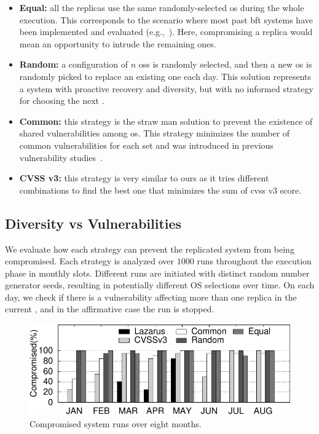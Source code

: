 \begin{itemize}

\item \textbf{Equal:} all the replicas use the same randomly-selected \gls{os} during the whole execution. 
This corresponds to the scenario where most past \gls{bft} systems have been implemented and evaluated (e.g.,~\cite{Kotla:2010,Aublin:2015,Behl:2015,Veronese:2013,Behl:2017,Liu:2016,Yin:2003,Amir:2011,Bessani:2014,Clement:2009b}). 
Here, compromising a replica would mean an opportunity to intrude the remaining ones.

\item \textbf{Random:} a configuration of $n$ \glspl{os} is randomly selected, and then a new \gls{os} is randomly picked to replace an existing one each day. 
This solution represents a system with proactive recovery and diversity, but with no informed strategy for choosing the next \ES.

\item \textbf{Common:} this strategy is the straw man solution to prevent the existence of shared vulnerabilities among \gls{os}. 
This strategy minimizes the number of common vulnerabilities for each set and was introduced in previous vulnerability studies~\cite{Garcia:2012}.

\item \textbf{CVSS v3:} this strategy is very similar to ours as it tries different combinations to find the best one that minimizes the sum of \gls{cvss} v3 score.


\end{itemize}


\subsection{Diversity vs Vulnerabilities}

We evaluate how each strategy can prevent the replicated system from being compromised. 
Each strategy is analyzed over $1000$ runs throughout the execution phase in monthly slots. 
Different runs are initiated with distinct random number generator seeds, resulting in potentially different OS selections over time. 
On each day, we check if there is a vulnerability affecting more than one replica in the current \ES, and in the affirmative case the run is stopped.


\begin{figure}[t]
\begin{center}
\includegraphics[width=\columnwidth]{images/gnuplot/executions/execution.pdf}
\caption{Compromised system runs over eight months.}
\label{fig:all_vulns}
\end{center}
\end{figure}


